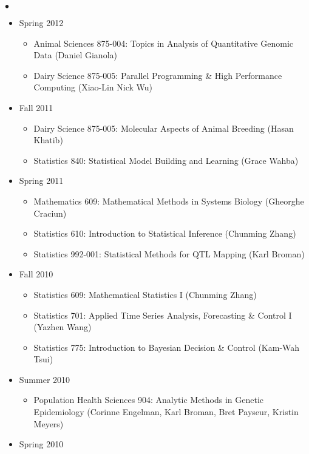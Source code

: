 \documentclass[margin,line,10pt]{res}
\newenvironment{list2}{
  \begin{list}{$\bullet$}{%
      \setlength{\itemsep}{0in}
      \setlength{\parsep}{0in} \setlength{\parskip}{0in}
      \setlength{\topsep}{0in} \setlength{\partopsep}{0in} 
      \setlength{\leftmargin}{0.2in}}}{\end{list}}
\begin{document}
\begin{resume}
\begin{list2}
\begin{itemize}
\item Spring 2012
\begin{itemize}
\item    Animal Sciences 875-004: Topics in Analysis of Quantitative Genomic Data (Daniel Gianola)
\item    Dairy Science 875-005: Parallel Programming \& High Performance Computing (Xiao-Lin Nick Wu)
\end{itemize}


\item Fall 2011
\begin{itemize}
\item    Dairy Science 875-005: Molecular Aspects of Animal Breeding (Hasan Khatib)
\item    Statistics 840: Statistical Model Building and Learning (Grace Wahba)
\end{itemize}



\item Spring 2011
\begin{itemize}
\item    Mathematics 609: Mathematical Methods in Systems Biology (Gheorghe Craciun)
\item    Statistics 610: Introduction to Statistical Inference (Chunming Zhang)
\item    Statistics 992-001: Statistical Methods for QTL Mapping (Karl Broman)
\end{itemize}


\item Fall 2010
\begin{itemize}
\item    Statistics 609: Mathematical Statistics I (Chunming Zhang)
\item    Statistics 701: Applied Time Series Analysis, Forecasting \& Control I (Yazhen Wang)
\item    Statistics 775: Introduction to Bayesian Decision \& Control (Kam-Wah Tsui)
\end{itemize}


\item Summer 2010
\begin{itemize}
\item    Population Health Sciences 904: Analytic Methods in Genetic Epidemiology (Corinne Engelman, Karl Broman, Bret Payseur, Kristin Meyers)
\end{itemize}


\item Spring 2010
\begin{itemize}


\end{itemize}
\end{itemize}
\end{list2}
\end{resume}
\end{document}
